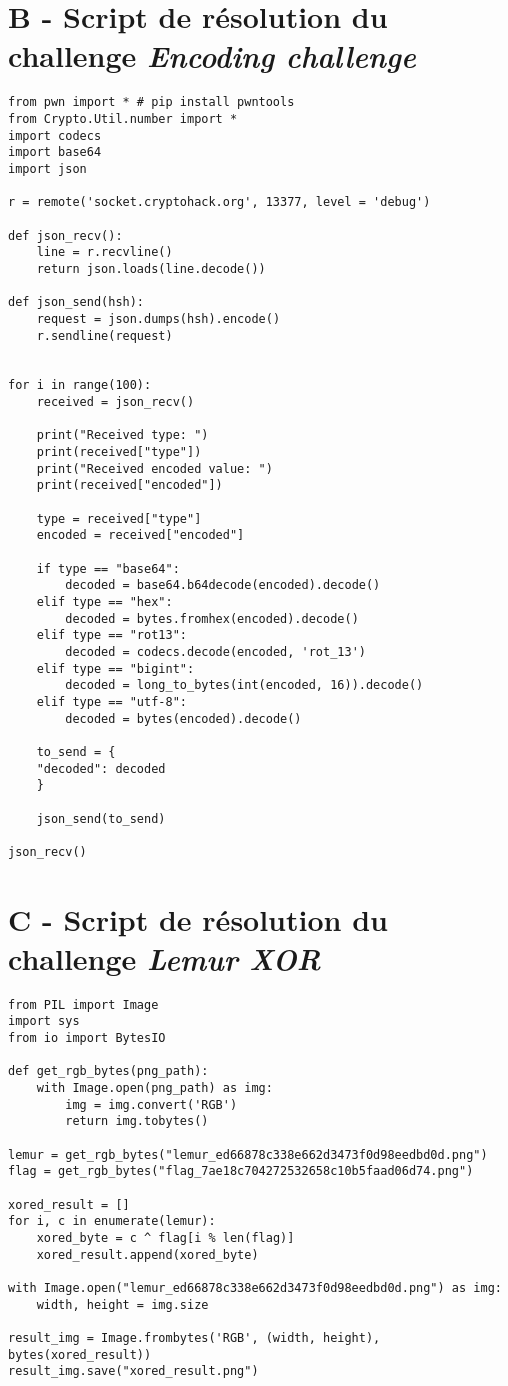 \newpage %
\section*{B - Script de résolution du challenge \textit{Encoding challenge}}
\label{annexe:script-res-encoding}

\begin{lstlisting}
from pwn import * # pip install pwntools
from Crypto.Util.number import *
import codecs
import base64
import json

r = remote('socket.cryptohack.org', 13377, level = 'debug')

def json_recv():
    line = r.recvline()
    return json.loads(line.decode())

def json_send(hsh):
    request = json.dumps(hsh).encode()
    r.sendline(request)


for i in range(100):
    received = json_recv()

    print("Received type: ")
    print(received["type"])
    print("Received encoded value: ")
    print(received["encoded"])

    type = received["type"]
    encoded = received["encoded"]

    if type == "base64":
        decoded = base64.b64decode(encoded).decode()
    elif type == "hex":
        decoded = bytes.fromhex(encoded).decode()
    elif type == "rot13":
        decoded = codecs.decode(encoded, 'rot_13')
    elif type == "bigint":
        decoded = long_to_bytes(int(encoded, 16)).decode()
    elif type == "utf-8":
        decoded = bytes(encoded).decode()

    to_send = {
    "decoded": decoded
    }

    json_send(to_send)

json_recv()
\end{lstlisting}

\newpage %
\section*{C - Script de résolution du challenge \textit{Lemur XOR}}
\label{annexe:script-lemur}

\begin{lstlisting}
from PIL import Image
import sys
from io import BytesIO

def get_rgb_bytes(png_path):
    with Image.open(png_path) as img:
        img = img.convert('RGB')
        return img.tobytes()

lemur = get_rgb_bytes("lemur_ed66878c338e662d3473f0d98eedbd0d.png")
flag = get_rgb_bytes("flag_7ae18c704272532658c10b5faad06d74.png")

xored_result = []
for i, c in enumerate(lemur):
    xored_byte = c ^ flag[i % len(flag)]
    xored_result.append(xored_byte)

with Image.open("lemur_ed66878c338e662d3473f0d98eedbd0d.png") as img:
    width, height = img.size

result_img = Image.frombytes('RGB', (width, height), bytes(xored_result))
result_img.save("xored_result.png")
\end{lstlisting}

